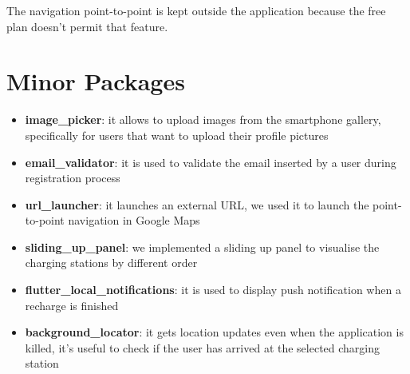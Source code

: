 The navigation point-to-point is kept outside the application because the free plan doesn't permit that feature. 
\section{Minor Packages}
\begin{itemize}
	\item \textbf{image\_picker}: it allows to upload images from the smartphone gallery, specifically for users that want to upload their profile pictures
	\item \textbf{email\_validator}: it is used to validate the email inserted by a user during registration process
	\item \textbf{url\_launcher}: it launches an external URL, we used it to launch the point-to-point navigation in Google Maps
	\item \textbf{sliding\_up\_panel}: we implemented a sliding up panel to visualise the charging stations by different order
	\item \textbf{flutter\_local\_notifications}: it is used to display push notification when a recharge is finished
	\item \textbf{background\_locator}: it gets location updates even when the application is killed, it's useful to check if the user has arrived at the selected charging station
\end{itemize}